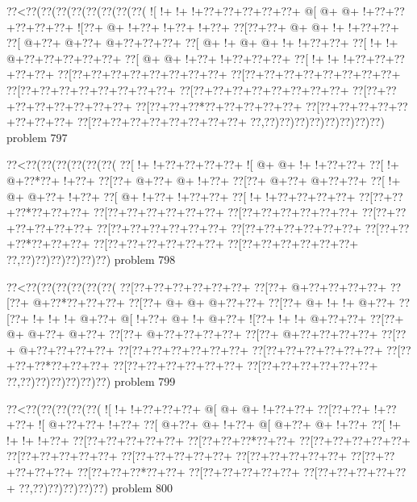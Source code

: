 \vbox{\vbox{\goo
\0??<\0??(\0??(\0??(\0??(\0??(\0??(\0??(\0??(
\- ![\- !+\- !+\- !+\0??+\0??+\0??+\0??+\0??+
\- @[\- @+\- @+\- !+\0??+\0??+\0??+\0??+\0??+
\- ![\0??+\- @+\- !+\0??+\- !+\0??+\- !+\0??+
\0??[\0??+\0??+\- @+\- @+\- !+\- !+\0??+\0??+
\0??[\- @+\0??+\- @+\0??+\- @+\0??+\0??+\0??+
\0??[\- @+\- !+\- @+\- @+\- !+\- !+\0??+\0??+
\0??[\- !+\- !+\- @+\0??+\0??+\0??+\0??+\0??+
\0??[\- @+\- @+\- !+\0??+\- !+\0??+\0??+\0??+
\0??[\- !+\- !+\- !+\0??+\0??+\0??+\0??+\0??+
\0??[\0??+\0??+\0??+\0??+\0??+\0??+\0??+\0??+
\0??[\0??+\0??+\0??+\0??+\0??+\0??+\0??+\0??+
\0??[\0??+\0??+\0??+\0??+\0??+\0??+\0??+\0??+
\0??[\0??+\0??+\0??+\0??+\0??+\0??+\0??+\0??+
\0??[\0??+\0??+\0??+\0??+\0??+\0??+\0??+\0??+
\0??[\0??+\0??+\0??*\0??+\0??+\0??+\0??+\0??+
\0??[\0??+\0??+\0??+\0??+\0??+\0??+\0??+\0??+
\0??[\0??+\0??+\0??+\0??+\0??+\0??+\0??+\0??+
\0??,\0??)\0??)\0??)\0??)\0??)\0??)\0??)\0??)
}
\hfil problem 797\hfil\break
}

\vbox{\vbox{\goo
\0??<\0??(\0??(\0??(\0??(\0??(\0??(
\0??[\- !+\- !+\0??+\0??+\0??+\0??+
\- ![\- @+\- @+\- !+\- !+\0??+\0??+
\0??[\- !+\- @+\0??*\0??+\- !+\0??+
\0??[\0??+\- @+\0??+\- @+\- !+\0??+
\0??[\0??+\- @+\0??+\- @+\0??+\0??+
\0??[\- !+\- @+\- @+\0??+\- !+\0??+
\0??[\- @+\- !+\0??+\- !+\0??+\0??+
\0??[\- !+\- !+\0??+\0??+\0??+\0??+
\0??[\0??+\0??+\0??*\0??+\0??+\0??+
\0??[\0??+\0??+\0??+\0??+\0??+\0??+
\0??[\0??+\0??+\0??+\0??+\0??+\0??+
\0??[\0??+\0??+\0??+\0??+\0??+\0??+
\0??[\0??+\0??+\0??+\0??+\0??+\0??+
\0??[\0??+\0??+\0??+\0??+\0??+\0??+
\0??[\0??+\0??+\0??*\0??+\0??+\0??+
\0??[\0??+\0??+\0??+\0??+\0??+\0??+
\0??[\0??+\0??+\0??+\0??+\0??+\0??+
\0??,\0??)\0??)\0??)\0??)\0??)\0??)
}
\hfil problem 798\hfil\break
}

\vbox{\vbox{\goo
\0??<\0??(\0??(\0??(\0??(\0??(\0??(
\0??[\0??+\0??+\0??+\0??+\0??+\0??+
\0??[\0??+\- @+\0??+\0??+\0??+\0??+
\0??[\0??+\- @+\0??*\0??+\0??+\0??+
\0??[\0??+\- @+\- @+\- @+\0??+\0??+
\0??[\0??+\- @+\- !+\- !+\- @+\0??+
\0??[\0??+\- !+\- !+\- !+\- @+\0??+
\- @[\- !+\0??+\- @+\- !+\- @+\0??+
\- ![\0??+\- !+\- !+\- @+\0??+\0??+
\0??[\0??+\- @+\- @+\0??+\- @+\0??+
\0??[\0??+\- @+\0??+\0??+\0??+\0??+
\0??[\0??+\- @+\0??+\0??+\0??+\0??+
\0??[\0??+\- @+\0??+\0??+\0??+\0??+
\0??[\0??+\0??+\0??+\0??+\0??+\0??+
\0??[\0??+\0??+\0??+\0??+\0??+\0??+
\0??[\0??+\0??+\0??*\0??+\0??+\0??+
\0??[\0??+\0??+\0??+\0??+\0??+\0??+
\0??[\0??+\0??+\0??+\0??+\0??+\0??+
\0??,\0??)\0??)\0??)\0??)\0??)\0??)
}
\hfil problem 799\hfil\break
}

\vbox{\vbox{\goo
\0??<\0??(\0??(\0??(\0??(\0??(
\- ![\- !+\- !+\0??+\0??+\0??+
\- @[\- @+\- @+\- !+\0??+\0??+
\0??[\0??+\0??+\- !+\0??+\0??+
\- ![\- @+\0??+\0??+\- !+\0??+
\0??[\- @+\0??+\- @+\- !+\0??+
\- @[\- @+\0??+\- @+\- !+\0??+
\0??[\- !+\- !+\- !+\- !+\0??+
\0??[\0??+\0??+\0??+\0??+\0??+
\0??[\0??+\0??+\0??*\0??+\0??+
\0??[\0??+\0??+\0??+\0??+\0??+
\0??[\0??+\0??+\0??+\0??+\0??+
\0??[\0??+\0??+\0??+\0??+\0??+
\0??[\0??+\0??+\0??+\0??+\0??+
\0??[\0??+\0??+\0??+\0??+\0??+
\0??[\0??+\0??+\0??*\0??+\0??+
\0??[\0??+\0??+\0??+\0??+\0??+
\0??[\0??+\0??+\0??+\0??+\0??+
\0??,\0??)\0??)\0??)\0??)\0??)
}
\hfil problem 800\hfil\break
}


